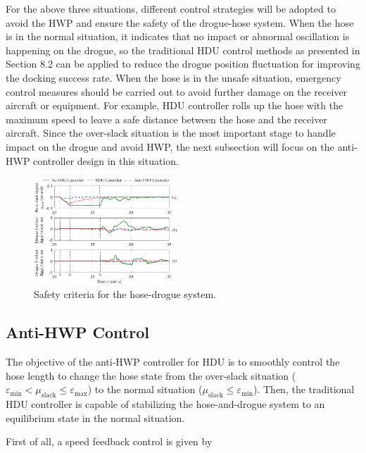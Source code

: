 For the above three situations, different control strategies will
be adopted to avoid the HWP and ensure the safety of the drogue-hose
system. When the hose is in the normal situation, it indicates that
no impact or abnormal oscillation is happening on the drogue, so the
traditional HDU control methods as presented in Section 8.2
can be applied to reduce the drogue position fluctuation for improving
the docking success rate. When the hose is in the unsafe situation,
emergency control measures should be carried out to avoid further
damage on the receiver aircraft or equipment. For example, HDU controller
rolls up the hose with the maximum speed to leave a safe distance
between the hose and the receiver aircraft. Since the over-slack situation
is the most important stage to handle impact on the drogue and avoid
HWP, the next subsection will focus on the anti-HWP controller design
in this situation.

\begin{figure}[ptbh]
	\begin{centering}
		\includegraphics[width=0.48\textwidth]{Figures/Figs_Ch8/Fig16}
		\par\end{centering}
	\caption{Safety criteria for the hose-drogue system.}
	\label{F_Safety}
\end{figure}


\subsection{Anti-HWP Control}

The objective of the anti-HWP controller for HDU is to smoothly control
the hose length to change the hose state from the over-slack situation
($\varepsilon_{\min}<\mu_\text{slack}\leq\varepsilon_{\max}$) to the normal
situation ($\mu_\text{slack}\leq\varepsilon_{\min}$). Then, the traditional
HDU controller is capable of stabilizing the hose-and-drogue system
to an equilibrium state in the normal situation.

First of all, a speed feedback control is given by

